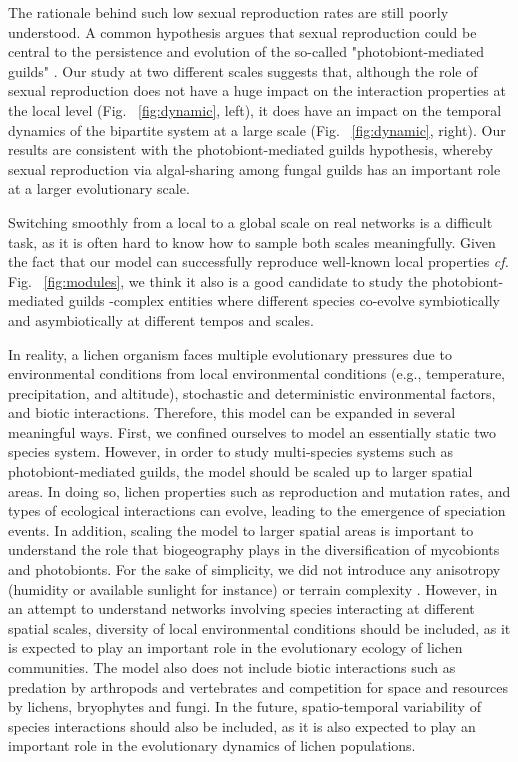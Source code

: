 \documentclass[fleqn,10pt]{wlscirep}
\begin{document}
 
The rationale behind such low sexual reproduction rates are still poorly understood. A common hypothesis argues that sexual reproduction could be central to the persistence and evolution of the so-called "photobiont-mediated guilds" \cite{rikkinen2003ecological, dal2011phylogeny}. Our study at two different scales suggests that, although the role of sexual reproduction does not have a huge impact on the interaction properties at the local level (Fig. ~\ref{fig:dynamic}, left), it does have an impact on the temporal dynamics of the bipartite system at a large scale (Fig. ~\ref{fig:dynamic}, right). Our results are consistent with the photobiont-mediated guilds hypothesis, whereby sexual reproduction via algal-sharing among fungal guilds has an important role at a larger evolutionary scale. 
 
 
Switching smoothly from a local to a global scale on real networks is a difficult task, as it is often hard to know how to sample both scales meaningfully. Given the fact that our model can successfully reproduce well-known local properties \emph{cf.} Fig. ~\ref{fig:modules}, we think it also is a good candidate to study the photobiont-mediated guilds -complex entities where different species co-evolve symbiotically and asymbiotically at different tempos and scales.

In reality, a lichen organism faces multiple evolutionary pressures due to environmental conditions from local environmental conditions (e.g., temperature, precipitation, and altitude), stochastic and deterministic environmental factors, and biotic interactions. Therefore, this model can be expanded in several meaningful ways. First, we confined ourselves to model an essentially static two species system. However, in order to study multi-species systems such as photobiont-mediated guilds, the model should be scaled up to larger spatial areas. In doing so, lichen properties such as reproduction and mutation rates, and types of ecological interactions can evolve, leading to the emergence of speciation events. In addition, scaling the model to larger spatial areas is important to understand the role that biogeography plays in the diversification of mycobionts and photobionts. For the sake of simplicity, we did not introduce any anisotropy (humidity or available sunlight for instance) or terrain complexity \cite{atmar1993measure}. However, in an attempt to understand networks involving species interacting at different spatial scales, diversity of local environmental conditions should be included, as it is expected to play an important role in the evolutionary ecology of lichen communities. The model also does not include biotic interactions such as predation by arthropods and vertebrates and competition for space and resources by lichens, bryophytes and fungi. In the future, spatio-temporal variability of species interactions should also be included, as it is also expected to play an important role in the evolutionary dynamics of lichen populations.  
\end{document}
